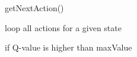 \documentclass[../Head/Main.tex]{subfiles}
\begin{document}
\begin{Pseudo}{getNextAction()}{}
	\begin{Indentation}
		\item loop all actions for a given state \vspace{-2pt}
		\begin{Indentation}
			\item if Q-value is higher than maxValue
		\end{Indentation}
	\end{Indentation}
\end{Pseudo}
\end{document}
